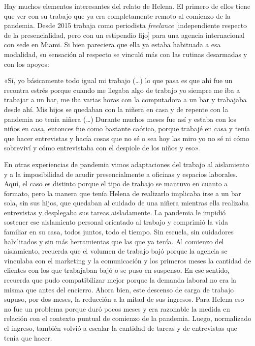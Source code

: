 \begin{refsection}
Hay muchos elementos interesantes del relato de Helena. El primero de ellos tiene que ver con su trabajo que ya era completamente remoto al comienzo de la pandemia. Desde 2015 trabaja como periodista \emph{freelance} [independiente respecto de la presencialidad, pero con un estipendio fijo] para una agencia internacional con sede en Miami. Si bien pareciera que ella ya estaba habituada a esa modalidad, su sensación al respecto se vinculó más con las rutinas desarmadas y con los apoyos:


\begin{gbcita}
«Sí, yo básicamente todo igual mi trabajo (…) lo que pasa es que ahí fue un recontra estrés porque cuando me llegaba algo de trabajo yo siempre me iba a trabajar a un bar, me iba varias horas con la computadora a un bar y trabajaba desde ahí. Mis hijos se quedaban con la niñera en casa y de repente con la pandemia no tenía niñera (…) Durante muchos meses fue así y estaba con los niños en casa, entonces fue como bastante caótico, porque trabajé en casa y tenía que hacer entrevistas y hacía cosas que no sé o sea hoy las miro yo no sé ni cómo sobreviví y cómo entrevistaba con el despiole de los niños y eso».

\end{gbcita}

En otras experiencias de pandemia vimos adaptaciones del trabajo al aislamiento y a la imposibilidad de acudir presencialmente a oficinas y espacios laborales. Aquí, el caso es distinto porque el tipo de trabajo se mantuvo en cuanto a formato, pero la manera que tenía Helena de realizarlo implicaba irse a un bar sola, sin sus hijos, que quedaban al cuidado de una niñera mientras ella realizaba entrevistas y desplegaba sus tareas aisladamente. La pandemia le impidió sostener ese aislamiento personal orientado al trabajo y comprimió la vida familiar en su casa, todos juntos, todo el tiempo. Sin escuela, sin cuidadores habilitados y sin más herramientas que las que ya tenía. Al comienzo del aislamiento, recuerda que el volumen de trabajo bajó porque la agencia se vinculaba con el marketing y la comunicación y los primeros meses la cantidad de clientes con los que trabajaban bajó o se puso en suspenso. En ese sentido, recuerda que pudo compatibilizar mejor porque la demanda laboral no era la misma que antes del encierro. Ahora bien, este descenso de carga de trabajo supuso, por dos meses, la reducción a la mitad de sus ingresos. Para Helena eso no fue un problema porque duró pocos meses y era razonable la medida en relación con el contexto puntual de comienzo de la pandemia. Luego, normalizado el ingreso, también volvió a escalar la cantidad de tareas y de entrevistas que tenía que hacer.


\end{refsection}
